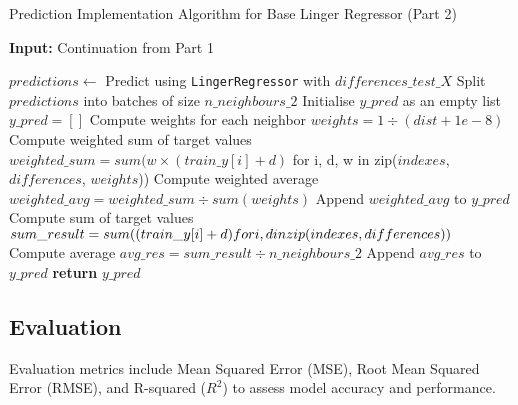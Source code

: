 \documentclass[a4paper, 12pt]{report}
\begin{document}
\begin{algorithm}[H]
    \caption{Prediction Implementation Algorithm for Base Linger Regressor (Part 2)}
    \textbf{Input:} Continuation from Part 1
    \label{alg:base_linger_regressor_predict_part1}
    \begin{algorithmic}[1]
            \State $predictions \gets$ Predict using \texttt{LingerRegressor} with $differences\_test\_X$
            \State Split $predictions$ into batches of size $n\_neighbours\_2$
            \State Initialise $y\_pred$ as an empty list 
            \State $y\_pred = []$
                    \State Compute weights for each neighbor
                    \State $weights = 1 \div (dist + 1e-8)$
                    \State Compute weighted sum of target values
                    \State $weighted\_sum = sum(w \times (train\_y[i] + d)$ for i, d, w in zip($indexes$, $differences$, $weights$))
                    \State Compute weighted average
                    \State $weighted\_avg = weighted\_sum \div sum(weights)$
                    \State Append $weighted\_avg$ to $y\_pred$
                \EndFor
            \Else
                    \State Compute sum of target values
                    \State $sum\_result =  sum((train\_y[i] + d) for \space i, d \space \space in \space zip(indexes, differences))$ 
                    \State Compute average
                    \State $avg\_res = sum\_result \div n\_neighbours\_2$
                    \State Append $avg\_res$ to $y\_pred$
                \EndFor
            \EndIf
            \State \textbf{return} $y\_pred$
        \EndFunction
    \end{algorithmic}
\end{algorithm}
\clearpage

\subsection{Evaluation}
Evaluation metrics include Mean Squared Error (MSE), Root Mean Squared Error (RMSE), and R-squared ($R^2$) to assess model accuracy and performance.
\end{document}
